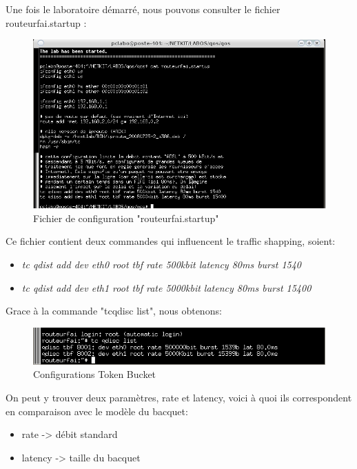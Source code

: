 \documentclass{article}
\begin{document}

\newpage
Une fois le laboratoire démarré, nous pouvons consulter le fichier routeurfai.startup :
\begin{figure}[h]
  \centering
  \includegraphics[width=\linewidth]{./captures/2-RouteurfaiStartup.png}
  \caption{Fichier de configuration "routeurfai.startup"}
  \label{fig:token-bucket}
\end{figure}

Ce fichier contient deux commandes qui influencent le traffic shapping, soient:
\begin{itemize}
\item \textit{tc qdist add dev eth0 root tbf rate 500kbit latency 80ms burst 1540}
\item \textit{tc qdist add dev eth1 root tbf rate 5000kbit latency 80ms burst 15400}
\end{itemize}

Grace à la commande "tcqdisc list", nous obtenons: 
\begin{figure}[h]
  \centering
  \includegraphics[width=\linewidth]{./captures/3-TokenBucket.png}
  \caption{Configurations Token Bucket}
  \label{fig:token-bucket}
\end{figure}

On peut y trouver deux paramètres, rate et latency, voici à quoi ils correspondent en comparaison avec le modèle du bacquet:
\begin{itemize}
\item rate -> débit standard
\item latency -> taille du bacquet
\end{itemize}
\end{document}
